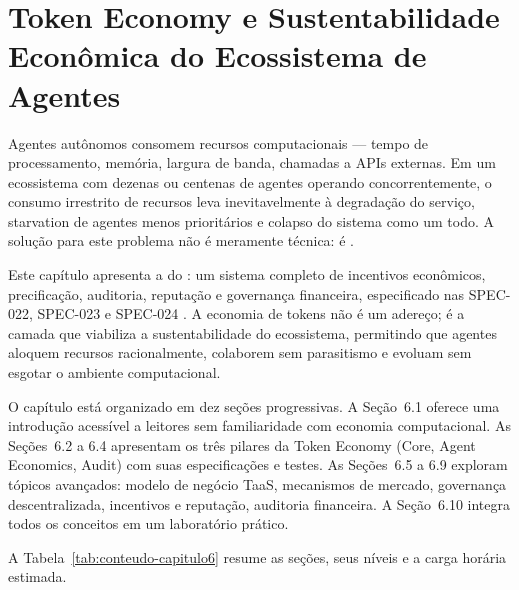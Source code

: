 \chapter{Token Economy e Sustentabilidade Econômica do Ecossistema de Agentes}
\label{cap:token-economy}

Agentes autônomos consomem recursos computacionais — tempo de
processamento, memória, largura de banda, chamadas a APIs externas.
Em um ecossistema com dezenas ou centenas de agentes operando
concorrentemente, o consumo irrestrito de recursos leva
inevitavelmente à degradação do serviço, starvation de agentes menos
prioritários e colapso do sistema como um todo. A solução para este
problema não é meramente técnica: é .

Este capítulo apresenta a  do \opencodeeco{}:
um sistema completo de incentivos econômicos, precificação,
auditoria, reputação e governança financeira, especificado nas
SPEC-022, SPEC-023 e SPEC-024 \cite{opencode2026token}. A economia
de tokens não é um adereço; é a camada que viabiliza a
sustentabilidade do ecossistema, permitindo que agentes aloquem
recursos racionalmente, colaborem sem parasitismo e evoluam sem
esgotar o ambiente computacional.

O capítulo está organizado em dez seções progressivas. A
Seção~6.1 oferece uma introdução acessível a leitores sem
familiaridade com economia computacional. As Seções~6.2 a 6.4
apresentam os três pilares da Token Economy (Core, Agent Economics,
Audit) com suas especificações e testes. As Seções~6.5 a 6.9
exploram tópicos avançados: modelo de negócio TaaS, mecanismos de
mercado, governança descentralizada, incentivos e reputação,
auditoria financeira. A Seção~6.10 integra todos os conceitos em
um laboratório prático.

A Tabela~\ref{tab:conteudo-capitulo6} resume as seções, seus níveis
e a carga horária estimada.

